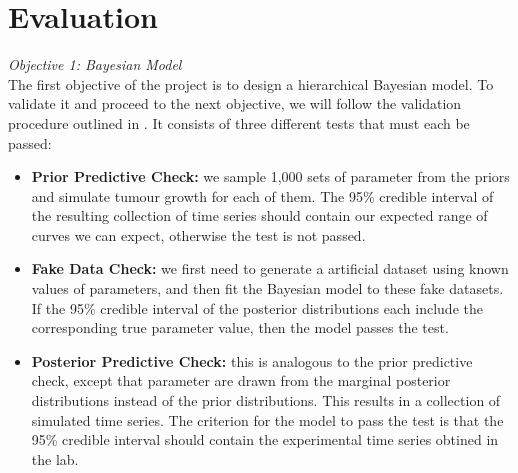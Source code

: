 \documentclass[11pt]{article}
\begin{document}
\section{Evaluation}\label{sec:eval}
\textit{Objective 1: Bayesian Model}\\[3pt]
    The first objective of the project is to design a hierarchical Bayesian model. To validate it and proceed to the next objective, we will follow the validation procedure outlined in \cite{gelman2020bayesian}. It consists of three different tests that must each be passed:
\begin{itemize}
    \item \textbf{Prior Predictive Check:} we sample 1,000 sets of parameter from the priors and simulate tumour growth for each of them. The 95\% credible interval of the resulting collection of time series should contain our expected range of curves we can expect, otherwise the test is not passed.
    \item \textbf{Fake Data Check:} we first need to generate a artificial dataset using known values of parameters, and then fit the Bayesian model to these fake datasets. If the 95\% credible interval of the posterior distributions each include the corresponding true parameter value, then the model passes the test.
    \item \textbf{Posterior Predictive Check:} this is analogous to the prior predictive check, except that parameter are drawn from the marginal posterior distributions instead of the prior distributions. This results in a collection of simulated time series. The criterion for the model to pass the test is that the 95\% credible interval should contain the experimental time series obtined in the lab. 
\end{itemize}
\end{document}
